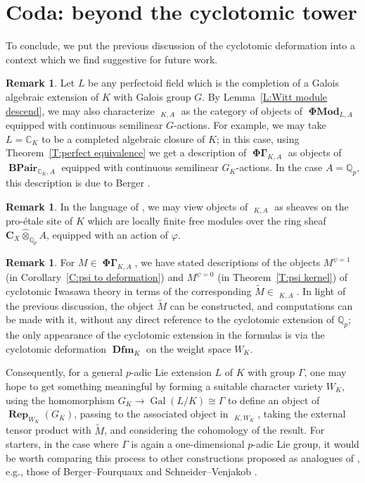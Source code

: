 \documentclass[12pt]{amsart}
\theoremstyle{definition}
\newtheorem{remark}[theorem]{Remark}
\numberwithin{equation}{theorem}
\newcommand{\bC}{\mathbf{C}}
\newcommand{\CC}{\mathbb{C}}
\newcommand{\Qp}{\mathbb{Q}_p}
\newcommand{\QQ}{\mathbb{Q}}
\DeclareMathOperator{\BPair}{\mathbf{BPair}}
\DeclareMathOperator{\Dfm}{\mathbf{Dfm}}
\DeclareMathOperator{\Gal}{Gal}
\DeclareMathOperator{\PhiGamma}{\mathbf{\Phi \Gamma}}
\DeclareMathOperator{\PhiGammatilde}{\widetilde{\mathbf{\Phi \Gamma}}}
\DeclareMathOperator{\PhiMod}{\mathbf{\Phi Mod}}
\DeclareMathOperator{\Rep}{\mathbf{Rep}}
\begin{document}
\section{Coda: beyond the cyclotomic tower}
\label{sec:coda}

To conclude, we put the previous discussion of the cyclotomic deformation into a context which we find suggestive for future work.

\begin{remark} \label{R:general field}
Let $L$ be any perfectoid field which is the completion of a Galois algebraic extension of $K$ with Galois group $G$.
By Lemma~\ref{L:Witt module descend}, we may also characterize $\PhiGammatilde_{K,A}$ 
as the category of objects of $\PhiMod_{L,A}$ equipped with continuous semilinear $G$-actions. For example, we may take $L = \CC_K$ to be a completed algebraic closure of $K$;
in this case, using Theorem~\ref{T:perfect equivalence} we get a description of
$\PhiGamma_{K,A}$ as objects of $\BPair_{\CC_K,A}$ equipped with continuous semilinear $G_K$-actions. In the case $A = \QQ_p$, this description is due to Berger \cite{berger-b-pairs}.
\end{remark}

\begin{remark}
In the language of \cite{kedlaya-liu1}, we may view objects of $\PhiGammatilde_{K,A}$
as sheaves on the pro-\'etale site of $K$ which are locally finite free modules over the ring sheaf $\bC_X \widehat{\otimes}_{\Qp} A$, equipped with an action of $\varphi$.
\end{remark}

\begin{remark}
For $M \in \PhiGamma_{K,A}$, we have stated descriptions of the objects $M^{\psi=1}$ 
(in Corollary~\ref{C:psi to deformation})
and $M^{\psi=0}$
(in Theorem~\ref{T:psi kernel}) of cyclotomic Iwasawa theory
in terms of the corresponding $\tilde{M} \in \PhiGammatilde_{K,A}$.
In light of the previous discussion, the object $\tilde{M}$ can be constructed, and computations can be made with it, without any direct reference to the cyclotomic extension of $\QQ_p$; the only appearance of the cyclotomic extension in the formulas is via the cyclotomic deformation $\Dfm_K$ on the weight space $W_K$.

Consequently, for a general $p$-adic Lie extension $L$ of $K$ with group $\Gamma$,
one may hope to get something meaningful by forming a suitable character variety $W_K$, using the homomorphism $G_K \to \Gal(L/K) \cong \Gamma$ to define an object of $\Rep_{W_K}(G_K)$, passing to the associated object in $\PhiGammatilde_{K,W_K}$,
taking the external tensor product with $\tilde{M}$,
and considering the cohomology of the result. For starters, in the case where $\Gamma$ is again a one-dimensional $p$-adic Lie group, it would be worth comparing this process to other constructions proposed as analogues of \cite{berger-explicit}, e.g.,
those of Berger--Fourquaux \cite{berger-fourquaux} and Schneider--Venjakob
\cite{schneider-venjakob}.
\end{remark}
\end{document}
